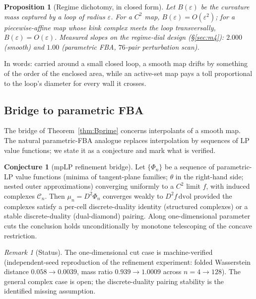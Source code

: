 \documentclass[11pt,a4paper]{article}
\theoremstyle{plain}
\newtheorem{proposition}[theorem]{Proposition}
\theoremstyle{definition}
\newtheorem{conjecture}[theorem]{Conjecture}
\theoremstyle{remark}
\newtheorem{remark}[theorem]{Remark}
\newcommand{\dvol}{\,\mathrm{dvol}}
\begin{document}
\begin{proposition}[Regime dichotomy, in closed form]
\label{prop:dichotomy}
Let $B(\varepsilon)$ be the curvature mass captured by a loop of radius
$\varepsilon$. For a $C^2$ map, $B(\varepsilon) = O(\varepsilon^2)$; for a
piecewise-affine map whose kink complex meets the loop transversally,
$B(\varepsilon) = O(\varepsilon)$. Measured slopes on the regime-dial design (\S\ref{sec:m4}): $2.000$ (smooth) and $1.00$ (parametric FBA,
$76$-pair perturbation scan).
\end{proposition}

In words: carried around a small closed loop, a smooth map drifts by
something of the order of the enclosed area, while an active-set map
pays a toll proportional to the loop's diameter for every wall it
crosses.

\subsection{Bridge to parametric FBA}

The bridge of Theorem~\ref{thm:Bprime} concerns interpolants of a
smooth map. The natural parametric-FBA analogue replaces interpolation
by sequences of LP value functions; we state it as a conjecture and
mark what is verified.

\begin{conjecture}[mpLP refinement bridge]\label{conj:bridge}
Let $\{\Phi_n\}$ be a sequence of parametric-LP value functions (minima of
tangent-plane families; $\theta$ in the right-hand side; nested outer
approximations) converging uniformly to a $C^2$ limit $f$, with induced
complexes $\mathcal{C}_n$. Then $\mu_n = D^2\Phi_n$ converges weakly to
$D^2 f \dvol$ provided the complexes satisfy a per-cell discrete-duality
identity (structured complexes) or a stable discrete-duality
(dual-diamond) pairing. Along one-dimensional parameter cuts the
conclusion holds unconditionally by monotone telescoping of the concave
restriction.
\end{conjecture}

\begin{remark}[Status]
The one-dimensional cut case is machine-verified (independent-seed
reproduction of the refinement experiment: folded Wasserstein distance
$0.058 \to 0.0039$, mass ratio $0.939 \to 1.0009$ across
$n = 4 \to 128$). The general complex case is open; the discrete-duality
pairing stability is the identified missing assumption.
\end{remark}
\end{document}
